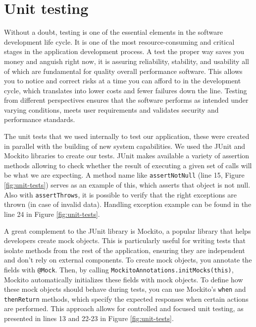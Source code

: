 \section{Unit testing}

Without a doubt, testing is one of the essential elements in the software development life cycle. It is one of the most resource-consuming and critical stages in the application development process. A test the proper way saves you money and anguish right now, it is assuring reliability, stability, and usability all of which are fundamental for quality overall performance software. This allows you to notice and correct risks at a time you can afford to in the development cycle, which translates into lower costs and fewer failures down the line. Testing from different perspectives ensures that the software performs as intended under varying conditions, meets user requirements and validates security and performance standards.

The unit tests that we used internally to test our application, these were created in parallel with the building of new system capabilities. We used the JUnit\cite{Junit} and Mockito\cite{Mockito} libraries to create our tests. JUnit makes available a variety of assertion methods allowing to check whether the result of executing a given set of calls will be what we are expecting. A method name like \texttt{assertNotNull} (line 15, Figure \ref{fig:unit-tests}) serves as an example of this, which asserts that object is not null. Also with \texttt{assertThrows}, it is possible to verify that the right exceptions are thrown (in case of invalid data). Handling exception example can be found in the line 24 in  Figure \ref{fig:unit-tests}.

A great complement to the JUnit library is Mockito, a popular library that helps developers create mock objects. This is particularly useful for writing tests that isolate methods from the rest of the application, ensuring they are independent and don't rely on external components. To create mock objects, you annotate the fields with \texttt{@Mock}. Then, by calling \texttt{MockitoAnnotations.initMocks(this)}, Mockito automatically initializes these fields with mock objects. To define how these mock objects should behave during tests, you can use Mockito's \texttt{when} and \texttt{thenReturn} methods, which specify the expected responses when certain actions are performed. This approach allows for controlled and focused unit testing, as presented in lines 13 and 22-23 in Figure \ref{fig:unit-tests}.

